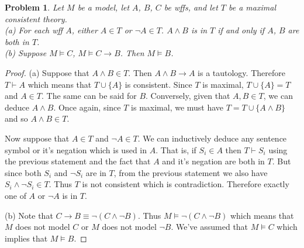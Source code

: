 \documentclass{article}
\newtheorem{problem}{Problem}
\begin{document}
\begin{problem}
Let $M$ be a model, let $A$, $B$, $C$ be wffs, and let $T$ be a maximal consistent theory.\\
(a) For each wff $A$, either $A \in T$ or $\neg A \in T$. $A \wedge B$ is in $T$ if and only if $A$, $B$ are both in $T$.\\
(b) Suppose $M \models C$, $M \models C \rightarrow B$. Then $M \models B$.
\end{problem}
\begin{proof}
(a) Suppose that $A \wedge B \in T$. Then $A \wedge B \rightarrow A$ is a tautology. Therefore $T \vdash A$ which means that $T \cup \{A\}$ is consistent. Since $T$ is maximal, $T \cup \{A\} = T$ and $A \in T$. The same can be said for $B$. Conversely, given that $A, B \in T$, we can deduce $A \wedge B$. Once again, since $T$ is maximal, we must have $T = T \cup \{A \wedge B\}$ and so $A \wedge B \in T$.

Now suppose that $A \in T$ and $\neg A \in T$. We can inductively deduce any sentence symbol or it's negation which is used in $A$. That is, if $S_i \in A$ then $T \vdash S_i$ using the previous statement and the fact that $A$ and it's negation are both in $T$. But since both $S_i$ and $\neg S_i$ are in $T$, from the previous statement we also have $S_i \wedge \neg S_i \in T$. Thus $T$ is not consistent which is contradiction. Therefore exactly one of $A$ or $\neg A$ is in $T$.

(b) Note that $C \rightarrow B \equiv \neg (C \wedge \neg B)$. Thus $M \models \neg (C \wedge \neg B)$ which means that $M$ does not model $C$ or $M$ does not model $\neg B$. We've assumed that $M \models C$ which implies that $M \models B$.
\end{proof}
\end{document}
